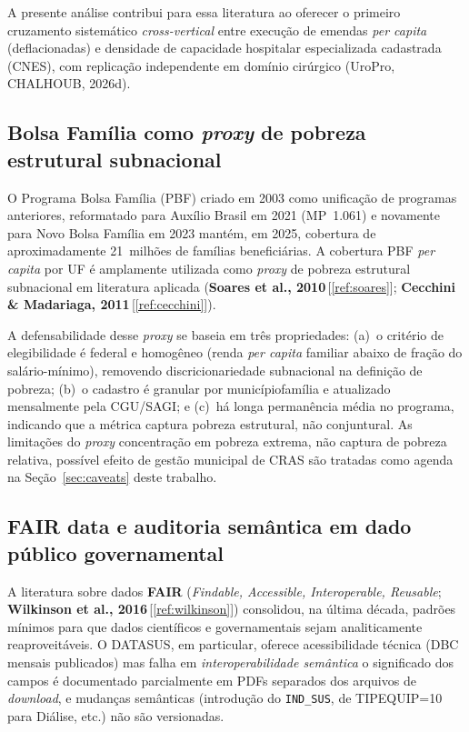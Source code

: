 \documentclass[12pt,a4paper,oneside]{article}
\begin{document}
A presente análise contribui para essa literatura ao oferecer o
primeiro cruzamento sistemático \textit{cross-vertical} entre
execução de emendas \textit{per capita} (deflacionadas) e densidade
de capacidade hospitalar especializada cadastrada (CNES), com
replicação independente em domínio cirúrgico (UroPro, CHALHOUB,
2026d).

\subsection{Bolsa Família como \textit{proxy} de pobreza estrutural
subnacional}\label{sub:lit-pbf}

O Programa Bolsa Família (PBF) \textendash{} criado em 2003 como
unificação de programas anteriores, reformatado para Auxílio Brasil
em 2021 (MP~1.061) e novamente para Novo Bolsa Família em 2023
\textendash{} mantém, em 2025, cobertura de aproximadamente 21~milhões
de famílias beneficiárias. A cobertura PBF \textit{per capita} por
UF é amplamente utilizada como \textit{proxy} de pobreza estrutural
subnacional em literatura aplicada (\textbf{Soares et al.,
2010}\,[\ref{ref:soares}]; \textbf{Cecchini \& Madariaga,
2011}\,[\ref{ref:cecchini}]).

A defensabilidade desse \textit{proxy} se baseia em três
propriedades: (a)~o critério de elegibilidade é federal e
homogêneo (renda \textit{per capita} familiar abaixo de fração do
salário-mínimo), removendo discricionariedade subnacional na
definição de pobreza; (b)~o cadastro é granular por
município\textendash{}família e atualizado mensalmente pela CGU/SAGI;
e (c)~há longa permanência média no programa, indicando que a
métrica captura pobreza estrutural, não conjuntural. As limitações
do \textit{proxy} \textendash{} concentração em pobreza extrema, não
captura de pobreza relativa, possível efeito de gestão municipal de
CRAS \textendash{} são tratadas como agenda na Seção~\ref{sec:caveats}
deste trabalho.

\subsection{FAIR data e auditoria semântica em dado público
governamental}\label{sub:lit-fair}

A literatura sobre dados \textbf{FAIR} (\textit{Findable,
Accessible, Interoperable, Reusable}; \textbf{Wilkinson et al.,
2016}\,[\ref{ref:wilkinson}]) consolidou, na última década, padrões
mínimos para que dados científicos e governamentais sejam
analiticamente reaproveitáveis. O DATASUS, em particular, oferece
acessibilidade técnica (DBC mensais publicados) mas falha em
\textit{interoperabilidade semântica} \textemdash{} o significado dos
campos é documentado parcialmente em PDFs separados dos arquivos de
\textit{download}, e mudanças semânticas (introdução do \texttt{IND\_SUS},
de TIPEQUIP=10 para Diálise, etc.) não são versionadas.
\end{document}
